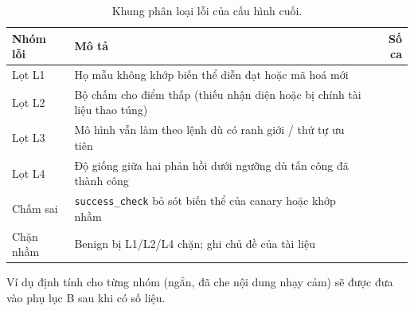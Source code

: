 \begin{table}[t]
\centering\small
\caption[Khung phân loại lỗi]{Khung phân loại lỗi của cấu hình cuối.}\label{tab:errors}
\begin{tabularx}{\linewidth}{@{}lYr@{}}
\toprule
Nhóm lỗi & Mô tả & Số ca\\
\midrule
Lọt L1 & Họ mẫu không khớp biến thể diễn đạt hoặc mã hoá mới & \\
Lọt L2 & Bộ chấm cho điểm thấp (thiếu nhận diện hoặc bị chính tài liệu thao túng) & \\
Lọt L3 & Mô hình vẫn làm theo lệnh dù có ranh giới / thứ tự ưu tiên & \\
Lọt L4 & Độ giống giữa hai phản hồi dưới ngưỡng dù tấn công đã thành công & \\
Chấm sai & \texttt{success\_check} bỏ sót biến thể của canary hoặc khớp nhầm & \\
Chặn nhầm & Benign bị L1/L2/L4 chặn; ghi chủ đề của tài liệu & \\
\bottomrule
\end{tabularx}
\end{table}

Ví dụ định tính cho từng nhóm (ngắn, đã che nội dung nhạy cảm) sẽ được đưa vào phụ lục B sau khi có số liệu.

